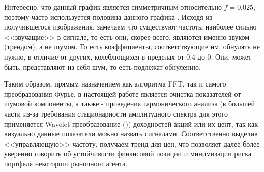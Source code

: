 Интересно, что данный график является симметричным относительно $f = 0.025$, поэтому часто используется половина данного графика \cite{brunton2022data}. Исходя из получившегося изображения, замечаем что существуют частоты наиболее сильно <<звучащие>> в сигнале, то есть они, скорее всего, являются именно звуком (трендом), а не шумом. То есть коэффициенты, соответствующие им, обнулять не нужно, в отличие от других, колеблющихся в пределах от $0.4$ до 0. Они, может быть, представляют из себя шум, то есть подлежат обнулению.

Таким образом, прямым назначением как алгоритма FFT, так и самого преобразования Фурье, в настоящей работе является очистка показателей от шумовой компоненты, а также - проведения гармонического анализа  (в большей части из-за требования стационарности амплитудного спектра для этого применяется Wavelet преобразование ()) доходностей акций или их цент, так как визуально данные показатели можно назвать сигналами. Соответственно выделив <<управляющую>> частоту, получаем тренд для цен, что позволяет далее более уверенно говорить об устойчивости финансовой позиции и минимизации риска портфеля некоторого рыночного агента.

